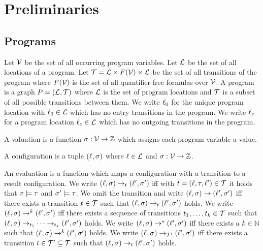 \section{Preliminaries}

\subsection{Programs}

\begin{definition}[Program] 
	Let $\mathcal{V}$ be the set of all occurring program variables.
	Let $\mathcal{L}$ be the set of all locations of a program.
	Let $\mathcal{T} = \mathcal{L} \times F(\mathcal{V}) \times \mathcal{L}$ be the set of all transitions of the program where $F(\mathcal{V})$ is the set of all quantifier-free formulas over $\mathcal{V}$.
	A program is a graph $P = (\mathcal{L}, \mathcal{T})$ where $\mathcal{L}$ is the set of program locations and $\mathcal{T}$ is a subset of all possible transitions between them.
	We write $\ell_0$ for the unique program location with $\ell_0 \in \mathcal{L}$ which has no entry transitions in the program.
	We write $\ell_e$ for a program location $\ell_e \in \mathcal{L}$ which has no outgoing transitions in the program.
\end{definition}

\begin{definition}[Valuation] 
	A valuation is a function $\sigma: \mathcal{V} \rightarrow \mathbb{Z}$ which assigns each program variable a value.
\end{definition}

\begin{definition}[Configuration] 
	A configuration is a tuple $(\ell_{}, \sigma_{})$ where $\ell \in \mathcal{L}$ and $\sigma: \mathcal{V} \rightarrow \mathbb{Z}$.
\end{definition}

\begin{definition}[Evaluation] 
	An evaluation is a function which maps a configuration with a transition to a result configuration.
	We write $(\ell, \sigma) \rightarrow_t (\ell', \sigma')$ iff with $t = (\ell, \tau, \ell') \in \mathcal{T}$ it holds that $\sigma \models \tau$ and $\sigma' \models \tau$.
	We omit the transition and write $(\ell, \sigma) \rightarrow (\ell', \sigma')$ iff there exists a transition $t \in \mathcal{T}$ such that $(\ell, \sigma) \rightarrow_t (\ell', \sigma')$ holds.
	We write $(\ell_{}, \sigma_{}) \rightarrow^k (\ell', \sigma')$ iff there exists a sequence of transitions $t_1, \dots, t_k \in \mathcal{T}$ such that $(\ell_{}, \sigma_{}) \rightarrow_{t_1} \dots \rightarrow_{t_k} (\ell', \sigma')$ holds.
	We write $(\ell_{}, \sigma_{}) \rightarrow^* (\ell', \sigma')$ iff there exists a $k \in \mathbb{N}$ such that $(\ell_{}, \sigma_{}) \rightarrow^k (\ell', \sigma')$ holds.
	We write $(\ell_{}, \sigma_{}) \rightarrow_{\mathcal{T}'} (\ell', \sigma')$ iff there exists a transition $t \in \mathcal{T}' \subseteq \mathcal{T}$ such that $(\ell_{}, \sigma_{}) \rightarrow_t (\ell', \sigma')$ holds.
\end{definition}

